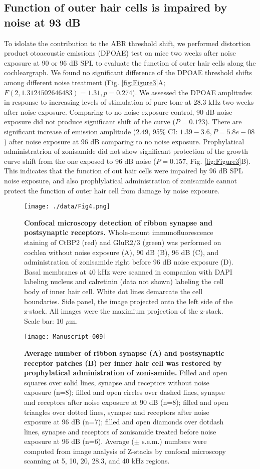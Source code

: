 \documentclass[11pt]{article}
\begin{document}
\subsection {Function of outer hair cells is impaired by noise at 93 dB}
To islolate the contribution to the ABR threshold shift, we performed distortion product otoacoustic emissions (DPOAE) test on mice two weeks after noise exposure at 90 or 96 dB SPL to evaluate the function of outer hair cells along the cochleargraph. We found no significant difference of the DPOAE threshold shifts among different noise treatment 
(Fig. \ref{fig:Figure3}A; $F(2,1.3124502646483)=1.31,
 p=0.274$). We assessed the DPOAE amplitudes in response to increasing levels of stimulation of pure tone at 28.3 kHz two weeks after noise exposure. Comparing to no noise exposure control, 90 dB noise exposure did not produce significant shift of the curve 
($P=0.123$). There are significant increase of emission amplitude ($2.49$, 95\% CI: $1.39 - 3.6, P= 5.8e-08$) after noise exposure at 96 dB comparing to no noise exposure. Prophylatical administratrion of zonisamide did not show significant protection of the growth curve shift from the one exposed to 96 dB noise ($P=0.157$, Fig. \ref{fig:Figure3}B).  
 This indicates that the function of out hair cells were impaired by 96 dB SPL noise exposure, and also prophlylatical administration of zonisamide cannot protect the function of outer hair cell from damage by noise exposure.

\begin{figure}[ht!]
\centering
\texttt{[image: ./data/Fig4.png]}
\caption{{\bf {Confocal microscopy detection of ribbon synapse and postsynaptic receptors.}}  Whole-mount immunofluorescence staining of CtBP2 (red) and GluR2/3 (green) was performed on cochlea without noise exposure (A), 90 dB (B), 96 dB (C), and administration of zonisamide right before 96 dB noise exposure (D). Basal membranes at 40 kHz were scanned in companion with DAPI labeling nucleus and calretinin (data not shown) labeling the cell body of inner hair cell. White dot lines demarcate the cell boundaries. Side panel, the image projected onto the left side of the z-stack. All images were the maximium projection of the z-stack. Scale bar: 10 $\mu$m. }
\label{fig:Figure4}
\end{figure}


\begin{figure}[ht!]
\centering
\texttt{[image: Manuscript-009]}
\caption{{\bf {Average number of ribbon synapse (A) and postsynaptic receptor patches (B) per inner hair cell was restored by prophylatical administration of zonisamide.}}  Filled and open squares over solid lines, synapse and receptors without noise exposure (n=8); filled  and open circles over dashed lines, synapse and receptors after noise exposure at 90 dB (n=8); filled  and open triangles over dotted lines, synapse and receptors after noise exposure at 96 dB (n=7); filled  and open diamonds over dotdash lines, synapse and receptors of zonisamide treated before noise exposure at 96 dB (n=6). Average ($\pm$ s.e.m.) numbers were computed from image analysis of Z-stacks by confocal microscopy scanning at 5, 10, 20, 28.3, and 40 kHz regions.}
\label{fig:Figure5}
\end{figure}
\end{document}
